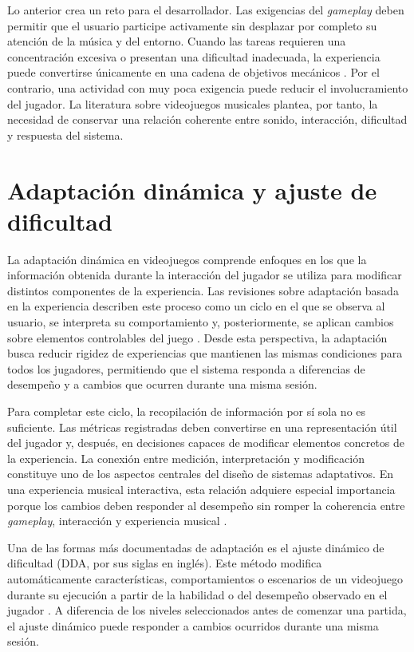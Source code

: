 Lo anterior crea un reto para el desarrollador. Las exigencias del 
\textit{gameplay} deben permitir que el usuario participe activamente 
sin desplazar por completo su atención de la música y del entorno. 
Cuando las tareas requieren una concentración excesiva o presentan una 
dificultad inadecuada, la experiencia puede convertirse únicamente en 
una cadena de objetivos mecánicos \cite{rashed2025engagement}. Por el 
contrario, una actividad con muy poca exigencia puede reducir el 
involucramiento del jugador. La literatura sobre videojuegos musicales 
plantea, por tanto, la necesidad de conservar una relación coherente 
entre sonido, interacción, dificultad y respuesta del sistema.

\section{Adaptación dinámica y ajuste de dificultad}
La adaptación dinámica en videojuegos comprende enfoques en los que la 
información obtenida durante la interacción del jugador se utiliza para 
modificar distintos componentes de la experiencia. Las revisiones sobre 
adaptación basada en la experiencia describen este proceso como un ciclo 
en el que se observa al usuario, se interpreta su comportamiento y, 
posteriormente, se aplican cambios sobre elementos controlables del 
juego \cite{lopes2025closing}. Desde esta perspectiva, la adaptación 
busca reducir rigidez de experiencias que mantienen las mismas 
condiciones para todos los jugadores, permitiendo que el sistema 
responda a diferencias de desempeño y a cambios que ocurren durante una 
misma sesión.

Para completar este ciclo, la recopilación de información por sí sola no 
es suficiente. Las métricas registradas deben convertirse en una 
representación útil del jugador y, después, en decisiones capaces de 
modificar elementos concretos de la experiencia. La conexión entre 
medición, interpretación y modificación constituye uno de los aspectos 
centrales del diseño de sistemas adaptativos. En una experiencia musical 
interactiva, esta relación adquiere especial importancia porque los 
cambios deben responder al desempeño sin romper la coherencia entre 
\textit{gameplay}, interacción y experiencia musical \cite{pichlmair2007sound}.

Una de las formas más documentadas de adaptación es el ajuste dinámico 
de dificultad (DDA, por sus siglas en inglés). Este método modifica 
automáticamente características, comportamientos o escenarios de un 
videojuego durante su ejecución a partir de la habilidad o del desempeño 
observado en el jugador \cite{zohaib2018dda}. A diferencia de los niveles 
seleccionados antes de comenzar una partida, el ajuste dinámico puede 
responder a cambios ocurridos durante una misma sesión.

